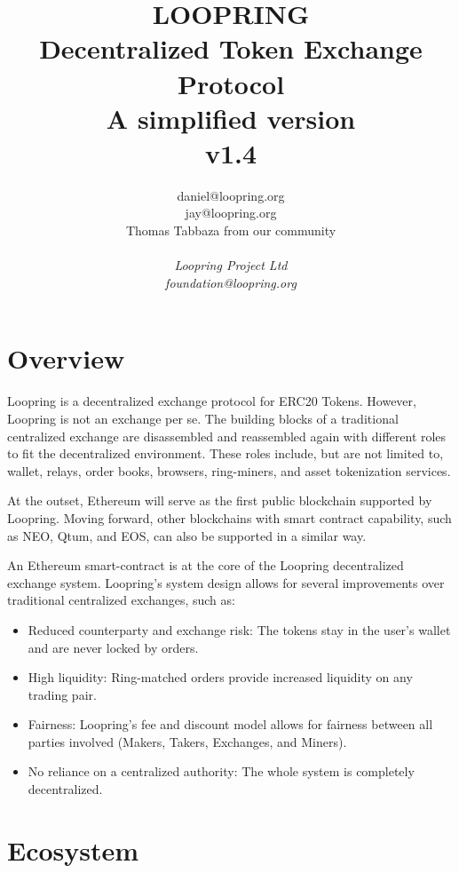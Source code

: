 \documentclass[UTF8,nofonts]{article}
\title{\textbf{LOOPRING}\\\textbf{Decentralized Token Exchange Protocol}\\\textbf{A simplified version}\\v1.4}
\author{
  daniel@loopring.org\\
  jay@loopring.org\\
  Thomas Tabbaza from our community\\
  \\
  \textit{Loopring Project Ltd}\\
  \textit{foundation@loopring.org}\\
 }
\begin{document}
\maketitle


\section{Overview\label{sec: overview}}

Loopring is a decentralized exchange protocol for ERC20 Tokens. However, Loopring is not an exchange per se. The building blocks of a traditional centralized exchange are disassembled and reassembled again with different roles to fit the decentralized environment. These roles include, but are not limited to, wallet, relays, order books, browsers, ring-miners, and asset tokenization services.

At the outset, Ethereum will serve as the first public blockchain supported by Loopring. Moving forward, other blockchains with smart contract capability, such as NEO, Qtum, and EOS, can also be supported in a similar way.

An Ethereum smart-contract is at the core of the Loopring decentralized exchange system. Loopring’s system design allows for several improvements over traditional centralized exchanges, such as:

\begin{itemize}
 \item Reduced counterparty and exchange risk: The tokens stay in the user's wallet and are never locked by orders.
 \item High liquidity: Ring-matched orders provide increased liquidity on any trading pair.
 \item Fairness: Loopring’s fee and discount model allows for fairness between all parties involved (Makers, Takers, Exchanges, and Miners).
 \item No reliance on a centralized authority: The whole system is completely decentralized.
\end{itemize}


\section{Ecosystem\label{sec: ecosystem}}
\end{document}
